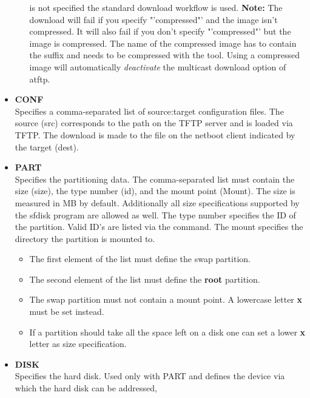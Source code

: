 \begin{itemize}
\begin{itemize}
        is not specified the standard download workflow is used. \textbf{Note:}
        The download will fail if you specify "'compressed"' and the image isn't
        compressed. It will also fail if you don't specify "'compressed"'
        but the image is compressed. The name of the compressed image has
        to contain the suffix  and needs to be compressed with the
         tool. Using a compressed image will automatically
        \emph{deactivate} the multicast download option of atftp.
    \end{itemize}
    \item \textbf{CONF}\\
        Specifies a comma-separated list of source:target
        configuration files. The source (src) corresponds to the path
        on the TFTP server and is loaded via TFTP. The
        download is made to the file on the netboot client
        indicated by the target (dest).
    \item \textbf{PART}\\
        Specifies the partitioning data. The comma-separated list
        must contain the size (size), the type number (id), and the
        mount point (Mount). The size is measured in MB by default.
        Additionally all size specifications supported by the sfdisk
        program are allowed as well. The type number specifies the ID
        of the partition. Valid ID's are listed via the
          command. The mount specifies the
        directory the partition is mounted to.
        \begin{itemize}
            \item The first element of the list must define the swap
                  partition.
            \item The second element of the list must define the
                  \textbf{root} partition.
            \item The swap partition must not contain a mount point.
                  A lowercase letter \textbf{x} must be set instead.
            \item If a partition should take all the space left on
                  a disk one can set a lower \textbf{x} letter as
                  size specification.
        \end{itemize}
    \item \textbf{DISK}\\
        Specifies the hard disk. Used only with PART and defines
        the device via which the hard disk can be addressed,

\end{itemize}
